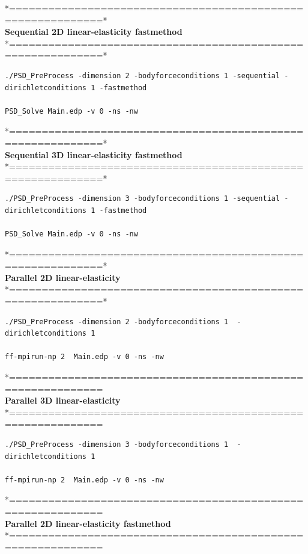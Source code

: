 *============================================================*\\
\textbf{ Sequential  2D linear-elasticity fastmethod }      \\
*============================================================*\\
\begin{lstlisting}[style=Linux] 
./PSD_PreProcess -dimension 2 -bodyforceconditions 1 -sequential -dirichletconditions 1 -fastmethod 

PSD_Solve Main.edp -v 0 -ns -nw	
\end{lstlisting}
*============================================================*\\
\textbf{ Sequential  3D linear-elasticity   fastmethod }     \\
*============================================================*\\
\begin{lstlisting}[style=Linux] 
./PSD_PreProcess -dimension 3 -bodyforceconditions 1 -sequential -dirichletconditions 1 -fastmethod 

PSD_Solve Main.edp -v 0 -ns -nw  	
\end{lstlisting}



*============================================================*\\
\textbf{ Parallel 2D linear-elasticity }                  \\
*============================================================*\\
	
\begin{lstlisting}[style=Linux]
./PSD_PreProcess -dimension 2 -bodyforceconditions 1  -dirichletconditions 1 

ff-mpirun-np 2  Main.edp -v 0 -ns -nw
\end{lstlisting}
*============================================================\\
\textbf{ Parallel 3D linear-elasticity  }                 \\
*============================================================\\
	
\begin{lstlisting}[style=Linux]
./PSD_PreProcess -dimension 3 -bodyforceconditions 1  -dirichletconditions 1 

ff-mpirun-np 2  Main.edp -v 0 -ns -nw
\end{lstlisting}
*============================================================\\
\textbf{ Parallel 2D linear-elasticity     fastmethod  }            \\
*============================================================\\
	
